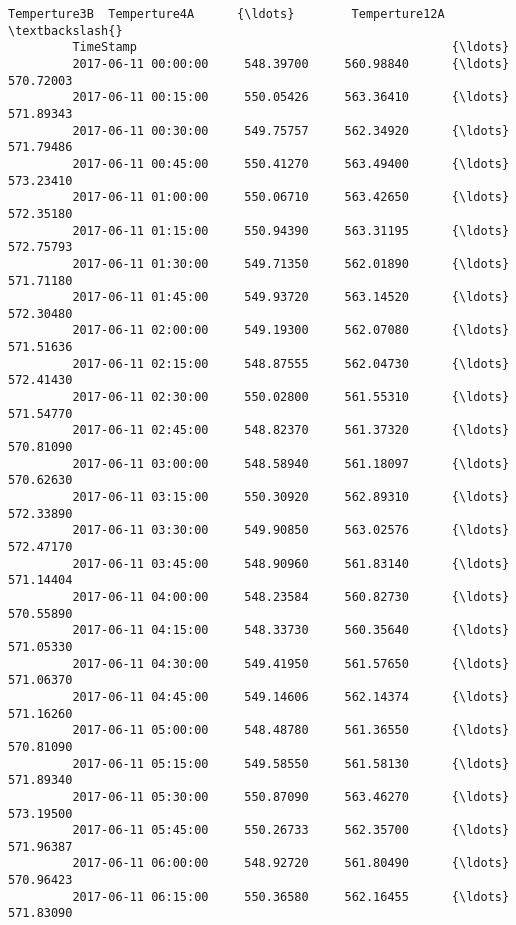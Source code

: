 \documentclass[11pt]{article}
\begin{document}
\begin{Verbatim}[commandchars=\\\{\}]
                              Temperture3B  Temperture4A      {\ldots}        Temperture12A  \textbackslash{}
         TimeStamp                                            {\ldots}                        
         2017-06-11 00:00:00     548.39700     560.98840      {\ldots}            570.72003   
         2017-06-11 00:15:00     550.05426     563.36410      {\ldots}            571.89343   
         2017-06-11 00:30:00     549.75757     562.34920      {\ldots}            571.79486   
         2017-06-11 00:45:00     550.41270     563.49400      {\ldots}            573.23410   
         2017-06-11 01:00:00     550.06710     563.42650      {\ldots}            572.35180   
         2017-06-11 01:15:00     550.94390     563.31195      {\ldots}            572.75793   
         2017-06-11 01:30:00     549.71350     562.01890      {\ldots}            571.71180   
         2017-06-11 01:45:00     549.93720     563.14520      {\ldots}            572.30480   
         2017-06-11 02:00:00     549.19300     562.07080      {\ldots}            571.51636   
         2017-06-11 02:15:00     548.87555     562.04730      {\ldots}            572.41430   
         2017-06-11 02:30:00     550.02800     561.55310      {\ldots}            571.54770   
         2017-06-11 02:45:00     548.82370     561.37320      {\ldots}            570.81090   
         2017-06-11 03:00:00     548.58940     561.18097      {\ldots}            570.62630   
         2017-06-11 03:15:00     550.30920     562.89310      {\ldots}            572.33890   
         2017-06-11 03:30:00     549.90850     563.02576      {\ldots}            572.47170   
         2017-06-11 03:45:00     548.90960     561.83140      {\ldots}            571.14404   
         2017-06-11 04:00:00     548.23584     560.82730      {\ldots}            570.55890   
         2017-06-11 04:15:00     548.33730     560.35640      {\ldots}            571.05330   
         2017-06-11 04:30:00     549.41950     561.57650      {\ldots}            571.06370   
         2017-06-11 04:45:00     549.14606     562.14374      {\ldots}            571.16260   
         2017-06-11 05:00:00     548.48780     561.36550      {\ldots}            570.81090   
         2017-06-11 05:15:00     549.58550     561.58130      {\ldots}            571.89340   
         2017-06-11 05:30:00     550.87090     563.46270      {\ldots}            573.19500   
         2017-06-11 05:45:00     550.26733     562.35700      {\ldots}            571.96387   
         2017-06-11 06:00:00     548.92720     561.80490      {\ldots}            570.96423   
         2017-06-11 06:15:00     550.36580     562.16455      {\ldots}            571.83090   

\end{Verbatim}
\end{document}
